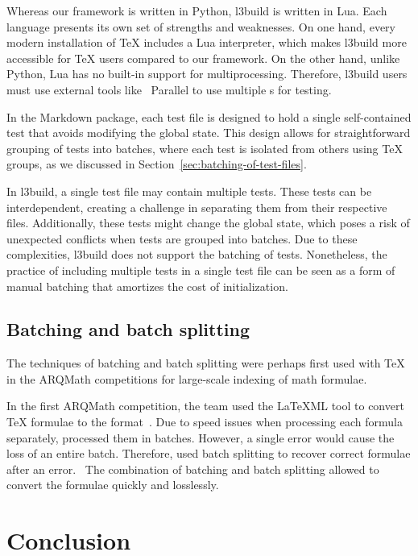 \documentclass[final]{ltugboat}
\begin{document}
Whereas our framework is written in Python, l3build is written in Lua. Each language presents its own set of strengths and weaknesses. On one hand, every modern installation of \TeX{} includes a Lua interpreter, which makes l3build more accessible for \TeX{} users compared to our framework. On the other hand, unlike Python, Lua has no built-in support for multiprocessing. Therefore, l3build users must use external tools like ~Parallel to use multiple s for testing.

In the Markdown package, each test file is designed to hold a single self-contained test that avoids modifying the global state. This design allows for straightforward grouping of tests into batches, where each test is isolated from others using \TeX{} groups, as we discussed in Section~\ref{sec:batching-of-test-files}.

In l3build, a single test file may contain multiple tests. These tests can be interdependent, creating a challenge in separating them from their respective files. Additionally, these tests might change the global state, which poses a risk of unexpected conflicts when tests are grouped into batches. Due to these complexities, l3build does not support the batching of tests. Nonetheless, the practice of including multiple tests in a single test file can be seen as a form of manual batching that amortizes the cost of initialization.

\subsection{Batching and batch splitting}
The techniques of batching and batch splitting were perhaps first used with \TeX{} in the ARQMath competitions for large-scale indexing of math formulae.

In the first ARQMath competition, the  team used the \LaTeX ML tool to convert \TeX{} formulae to the  format~\cite[Section~2.2]{novotny2020three}. Due to speed issues when processing each formula separately,  processed them in batches. However, a single error would cause the loss of an entire batch. Therefore,  used batch splitting to recover correct formulae after an error.~\cite{novotny2020arqmath} The combination of batching and batch splitting allowed  to convert the formulae quickly and losslessly.

\section{Conclusion}
\label{sec:conclusion}
\end{document}
